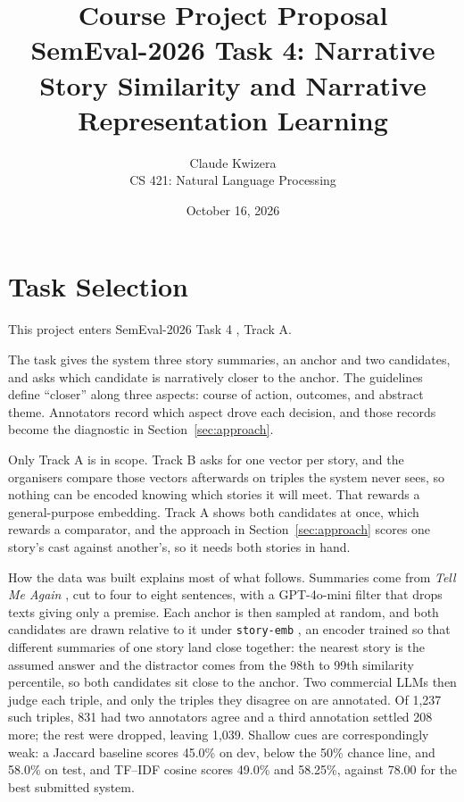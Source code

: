 \documentclass[11pt,letterpaper]{article}
\title{\vspace{-3em}\textbf{Course Project Proposal}\\[1pt]
\normalsize SemEval-2026 Task 4: Narrative Story Similarity and Narrative Representation Learning}
\author{Claude Kwizera \\ \small CS 421: Natural Language Processing}
\date{\small October 16, 2026}
\begin{document}
\maketitle
\thispagestyle{empty}
\vspace{-3em}

\section{Task Selection}

This project enters SemEval-2026 Task 4 \cite{hatzel2026}, Track A.

The task gives the system three story summaries, an anchor and two candidates, and asks which candidate is
narratively closer to the anchor. The guidelines define ``closer'' along three aspects: course of
action, outcomes, and abstract theme. Annotators record which aspect drove each decision, and those records
become the diagnostic in Section~\ref{sec:approach}.

Only Track A is in scope. Track B asks for one vector per story, and the organisers compare those vectors
afterwards on triples the system never sees, so nothing can be encoded knowing which stories it will meet. That
rewards a general-purpose embedding. Track A shows both candidates at once, which rewards a comparator, and the
approach in Section~\ref{sec:approach} scores one story's cast against another's, so it needs both stories in hand.

How the data was built explains most of what follows. Summaries come from \emph{Tell Me Again}
\cite{tellmeagain}, cut to four to eight sentences, with a GPT-4o-mini filter that drops texts giving only a
premise. Each anchor is then sampled at random, and both candidates are drawn relative to it under
\texttt{story-emb} \cite{storyemb}, an encoder trained so that different summaries of one story land close
together: the nearest story is the assumed answer and the distractor comes from the 98th to 99th similarity
percentile, so both candidates sit close to the anchor. Two commercial LLMs then judge each triple, and only the
triples they disagree on are annotated. Of 1,237 such triples, 831 had two annotators agree and a third
annotation settled 208 more; the rest were dropped, leaving 1,039. Shallow cues are correspondingly weak: a
Jaccard baseline scores 45.0\% on dev, below the 50\% chance line, and 58.0\% on test, and TF--IDF cosine
scores 49.0\% and 58.25\%, against 78.00 for the best submitted system.
\end{document}
